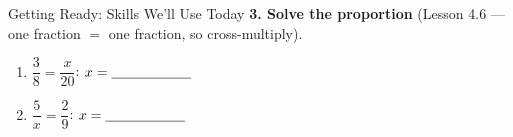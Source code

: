 \documentclass[10pt]{article}
\begin{document}
\begin{notesbox}{Getting Ready: Skills We'll Use Today}
\vspace{5pt}
\textbf{3. Solve the proportion} (Lesson 4.6 --- one fraction $=$ one fraction, so cross-multiply).
\begin{enumerate}[label=(\alph*), leftmargin=2.1em, itemsep=3pt]
  \item $\dfrac{3}{8}=\dfrac{x}{20}$: \quad $x=\blank{2.0cm}$
  \item $\dfrac{5}{x}=\dfrac{2}{9}$: \quad $x=\blank{2.0cm}$
\end{enumerate}
\end{notesbox}
\end{document}

